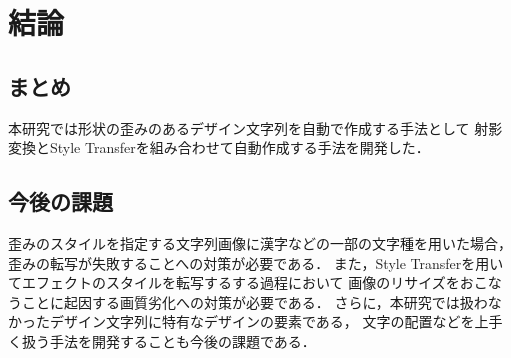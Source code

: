 \documentclass[\homedir/main.tex]{subfiles}
\begin{document}
\setcounter{chapter}{5}
\chapter{結論}\label{chap:summary}

\section{まとめ}
本研究では形状の歪みのあるデザイン文字列を自動で作成する手法として
射影変換とStyle Transferを組み合わせて自動作成する手法を開発した．

\section{今後の課題}
歪みのスタイルを指定する文字列画像に漢字などの一部の文字種を用いた場合，
歪みの転写が失敗することへの対策が必要である．
また，Style Transferを用いてエフェクトのスタイルを転写するする過程において
画像のリサイズをおこなうことに起因する画質劣化への対策が必要である．
さらに，本研究では扱わなかったデザイン文字列に特有なデザインの要素である，
文字の配置などを上手く扱う手法を開発することも今後の課題である．

\printBibForSubfiles
\end{document}
